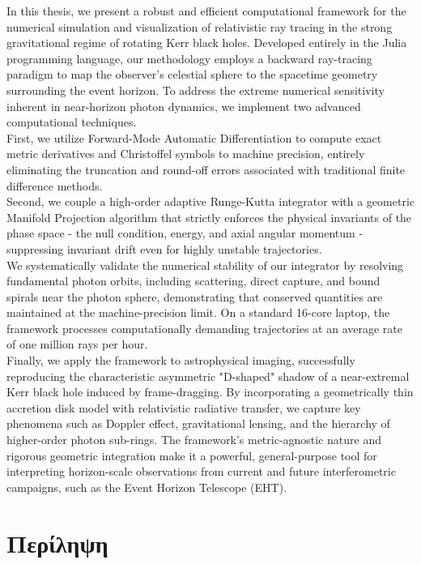 \documentclass[11pt]{book}
\begin{document}
In this thesis, we present a robust and efficient computational framework for the numerical simulation and visualization of relativistic ray tracing in the strong gravitational regime of rotating Kerr black holes. Developed entirely in the Julia programming language, our methodology employs a backward ray-tracing paradigm to map the observer's celestial sphere to the spacetime geometry surrounding the event horizon. To address the extreme numerical sensitivity inherent in near-horizon photon dynamics, we implement two advanced computational techniques.\\
First, we utilize Forward-Mode Automatic Differentiation to compute exact metric derivatives and Christoffel symbols to machine precision, entirely eliminating the truncation and round-off errors associated with traditional finite difference methods. \\
Second, we couple a high-order adaptive Runge-Kutta integrator with a geometric Manifold Projection algorithm that strictly enforces the physical invariants of the phase space - the null condition, energy, and axial angular momentum - suppressing invariant drift even for highly unstable trajectories.\\
We systematically validate the numerical stability of our integrator by resolving fundamental photon orbits, including scattering, direct capture, and bound spirals near the photon sphere, demonstrating that conserved quantities are maintained at the machine-precision limit. On a standard 16-core laptop, the framework processes computationally demanding trajectories at an average rate of one million rays per hour.\\
 Finally, we apply the framework to astrophysical imaging, successfully reproducing the characteristic asymmetric "D-shaped" shadow of a near-extremal Kerr black hole induced by frame-dragging. By incorporating a geometrically thin accretion disk model with relativistic radiative transfer, we capture key phenomena such as Doppler effect, gravitational lensing, and the hierarchy of higher-order photon sub-rings. The framework's metric-agnostic nature and rigorous geometric integration make it a powerful, general-purpose tool for interpreting horizon-scale observations from current and future interferometric campaigns, such as the Event Horizon Telescope (EHT).
\newpage

\section*{Περίληψη}
\end{document}
